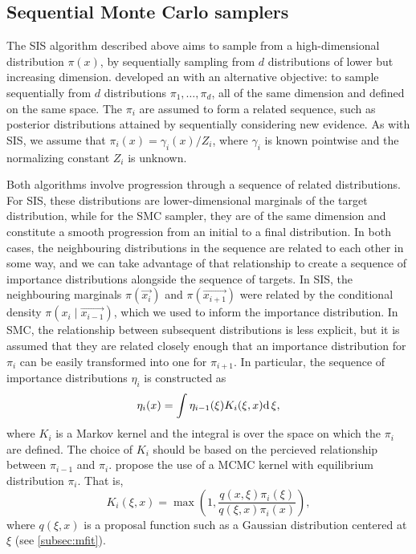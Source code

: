 \subsection{Sequential Monte Carlo samplers}
\label{subsec:smcsamp}

The \gls{SIS} algorithm described above aims to sample from a high-dimensional
distribution $\pi(x)$, by sequentially sampling from $d$ distributions of lower
but increasing dimension. \textcite{del2006sequential} developed an
 with an alternative objective: to sample sequentially
from $d$ distributions $\pi_1, \ldots, \pi_d$, all of the same dimension and
defined on the same space. The $\pi_i$ are assumed to form a related sequence,
such as posterior distributions attained by sequentially considering new
evidence. As with \gls{SIS}, we assume that $\pi_i(x) = \gamma_i(x) / Z_i$,
where $\gamma_i$ is known pointwise and the normalizing constant $Z_i$ is
unknown.

Both algorithms involve progression through a sequence of related
distributions. For \gls{SIS}, these distributions are lower-dimensional
marginals of the target distribution, while for the \gls{SMC} sampler, they are
of the same dimension and constitute a smooth progression from an initial to a
final distribution. In both cases, the neighbouring distributions in the
sequence are related to each other in some way, and we can take advantage of
that relationship to create a sequence of importance distributions alongside
the sequence of targets. In \gls{SIS}, the neighbouring marginals
$\pi(\vec{x_i})$ and $\pi(\vec{x_{i+1}})$ were related by the conditional
density $\pi(x_i \mid \vec{x_{i-1}})$, which we used to inform the importance
distribution. In \gls{SMC}, the relationship between subsequent distributions
is less explicit, but it is assumed that they are related closely enough that
an importance distribution for $\pi_i$ can be easily transformed into one for
$\pi_{i+1}$. In particular, the sequence of importance distributions $\eta_i$
is constructed as
\begin{align}
  \label{eq:impint}
  \eta_i(x) = \int \eta_{i-1}(\xi) K_i(\xi, x) \mathrm{d}\,\xi,
\end{align}
where $K_i$ is a Markov kernel and the integral is over the space on which the
$\pi_i$ are defined. The choice of $K_i$ should be based on the percieved
relationship between $\pi_{i-1}$ and $\pi_i$. \textcite{del2006sequential}
propose the use of a \gls{MCMC} kernel with equilibrium distribution $\pi_i$.
That is,
\[
  K_i(\xi, x) = \max\left(1, \frac{q(x, \xi)\pi_i(\xi)}{q(\xi, x)\pi_i(x)}\right),
\]
where $q(\xi, x)$ is a proposal function such as a Gaussian distribution
centered at $\xi$ (see \cref{subsec:mfit}). 

